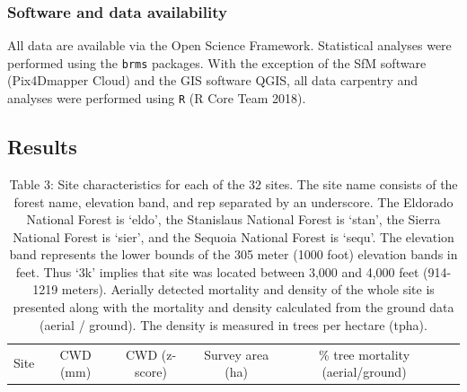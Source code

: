 \documentclass[]{article}
\begin{document}
\subsubsection{Software and data
availability}\label{software-and-data-availability}

All data are available via the Open Science Framework. Statistical
analyses were performed using the \texttt{brms} packages. With the
exception of the SfM software (Pix4Dmapper Cloud) and the GIS software
QGIS, all data carpentry and analyses were performed using \texttt{R} (R
Core Team 2018).

\subsection{Results}\label{results}

\begin{longtable}[]{@{}cccccc@{}}
\caption{Table 3: Site characteristics for each of the 32 sites. The
site name consists of the forest name, elevation band, and rep separated
by an underscore. The Eldorado National Forest is `eldo', the Stanislaus
National Forest is `stan', the Sierra National Forest is `sier', and the
Sequoia National Forest is `sequ'. The elevation band represents the
lower bounds of the 305 meter (1000 foot) elevation bands in feet. Thus
`3k' implies that site was located between 3,000 and 4,000 feet
(914-1219 meters). Aerially detected mortality and density of the whole
site is presented along with the mortality and density calculated from
the ground data (aerial / ground). The density is measured in trees per
hectare (tpha).}\tabularnewline
\toprule
\begin{minipage}[b]{0.11\columnwidth}\centering\strut
Site\strut
\end{minipage} & \begin{minipage}[b]{0.07\columnwidth}\centering\strut
CWD (mm)\strut
\end{minipage} & \begin{minipage}[b]{0.11\columnwidth}\centering\strut
CWD (z-score)\strut
\end{minipage} & \begin{minipage}[b]{0.13\columnwidth}\centering\strut
Survey area (ha)\strut
\end{minipage} & \begin{minipage}[b]{0.18\columnwidth}\centering\strut
\% tree mortality (aerial/ground)\strut
\end{minipage} & \begin{minipage}[b]{0.22\columnwidth}\centering\strut

\end{minipage}
\end{longtable}
\end{document}
